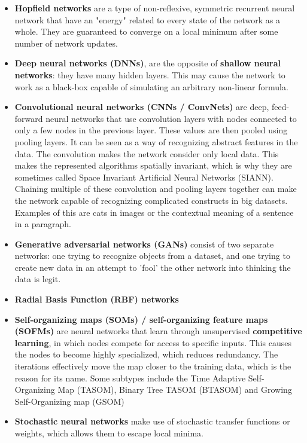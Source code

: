 \begin{itemize}
\begin{itemize}
			\item \textbf{Hopfield networks}
				are a type of non-reflexive, symmetric recurrent neural network that have an "energy" related to every state of the network as a whole. They are guaranteed to converge on a local minimum after some number of network updates.
			\item \textbf{Deep neural networks (DNNs)},
				are the opposite of \textbf{shallow neural networks}: they have many hidden layers. This may cause the network to work as a black-box
				capable of simulating an arbitrary non-linear formula.
			\item \textbf{Convolutional neural networks (CNNs / ConvNets)}
				are deep, feed-forward neural networks that use convolution layers with nodes connected to only a few nodes in the previous layer. These values are then pooled using pooling layers. It can be seen as a way of recognizing abstract features in the data. The convolution makes the network consider only local data. This makes the represented algorithms spatially invariant, which is why they are sometimes called Space Invariant Artificial Neural Networks (SIANN). Chaining multiple of these convolution and pooling layers together can make the network capable of recognizing complicated constructs in big datasets. Examples of this are cats in images or the contextual meaning of a sentence in a paragraph.
			\item \textbf{Generative adversarial networks (GANs)}
				consist of two separate networks: one trying to recognize objects from a dataset, and one trying to create new data in an attempt to 'fool' the other network into thinking the data is legit.\cite{Li:2013:CAL:2463372.2465801}
			\item \textbf{Radial Basis Function (RBF) networks}
				\cite{rbf}
			\item \textbf{Self-organizing maps (SOMs) / self-organizing feature maps (SOFMs)}
				are neural networks that learn through unsupervised \textbf{competitive learning}, in which nodes compete for access to specific inputs. This causes the nodes to become highly specialized, which reduces redundancy. The iterations effectively move the map closer to the training data, which is the reason for its name. Some subtypes include the Time Adaptive Self-Organizing Map (TASOM), Binary Tree TASOM (BTASOM) and Growing Self-Organizing map (GSOM)
			\item \textbf{Stochastic neural networks}
				make use of stochastic transfer functions or weights, which allows them to escape local minima. 

\end{itemize}
\end{itemize}
